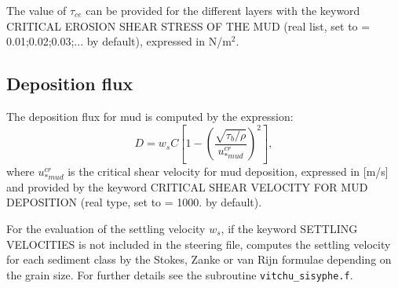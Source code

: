 The value of $\tau_{ce}$ can be provided for the different layers with the keyword {\ttfamily CRITICAL EROSION SHEAR STRESS OF THE MUD} (real list, set to {\ttfamily = 0.01;0.02;0.03;...} by default), expressed in N/m$^2$.

\subsection{Deposition flux}
The deposition flux for mud is computed by the expression:
\begin{equation}
D = w_{s} C \left[1-\left(\frac{\sqrt{\tau_b/\rho}}{u_{*mud}^{cr}}\right)^2 \right],
\end{equation}
where $u_{*mud}^{cr}$ is the critical shear velocity for mud deposition, expressed in [m/s] and provided by the keyword {\ttfamily CRITICAL SHEAR VELOCITY FOR MUD DEPOSITION} (real type, set to {\ttfamily = 1000.} by default).

For the evaluation of the settling velocity $w_s $, if the keyword {\ttfamily SETTLING VELOCITIES} is not included in the steering file, \sisyphe{} computes the settling velocity for each sediment class by the Stokes, Zanke or van Rijn formulae depending on the grain size. For further details see the subroutine \texttt{vitchu\_sisyphe.f}.

